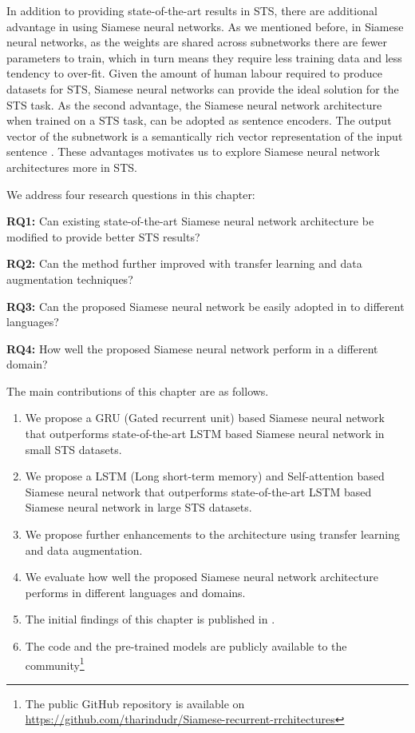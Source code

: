 In addition to providing state-of-the-art results in STS, there are additional advantage in using Siamese neural networks. As we mentioned before, in Siamese neural networks, as the weights are shared across subnetworks there are fewer parameters to train, which in turn means they require less training data and less tendency to over-fit. Given the amount of human labour required to produce datasets for STS, Siamese neural networks can provide the ideal solution for the STS task. As the second advantage, the Siamese neural network architecture when trained on a STS task, can be adopted as sentence encoders. The output vector of the subnetwork is a semantically rich vector representation of the input sentence \cite{Mueller_Thyagarajan_2016}. These advantages motivates us to explore Siamese neural network architectures more in STS. 


We address four research questions in this chapter:

\textbf{RQ1:} Can existing state-of-the-art Siamese neural network architecture be modified to provide better STS results?

\textbf{RQ2:} Can the method further improved with transfer learning and data augmentation techniques?

\textbf{RQ3:} Can the proposed Siamese neural network be easily adopted in to different languages?

\textbf{RQ4:} How well the proposed Siamese neural network perform in a different domain? 


The main contributions of this chapter are as follows.

\begin{enumerate}
	\item We propose a GRU (Gated recurrent unit) based Siamese neural network that outperforms state-of-the-art LSTM based Siamese neural network in small STS datasets. 
	
	\item We propose a LSTM (Long short-term memory) and Self-attention based Siamese neural network that outperforms state-of-the-art LSTM based Siamese neural network in large STS datasets.
	
	\item We propose further enhancements to the architecture using transfer learning and data augmentation.  
	
	\item We evaluate how well the proposed Siamese neural network architecture performs in different languages and domains. 
	
	\item The initial findings of this chapter is published in \citet{ranasinghe-etal-2019-semantic}. 
	
	\item The code and the pre-trained models are publicly available to the community\footnote{The public GitHub repository is available on \url{https://github.com/tharindudr/Siamese-recurrent-rrchitectures}}
\end{enumerate}


